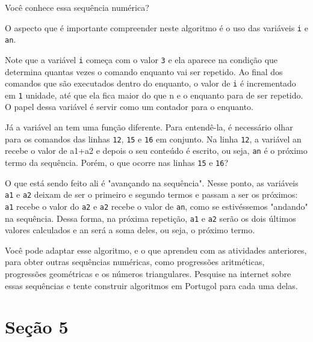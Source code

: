 \begin{reflection}
Você conhece essa sequência numérica?
\end{reflection}

O aspecto que é importante compreender neste algoritmo é o uso das variáveis \verb|i| e \verb|an|.

Note que a variável \verb|i| começa com o valor \verb|3| e ela aparece na condição que determina quantas vezes o comando enquanto vai ser repetido. Ao final dos comandos que são executados dentro do enquanto, o valor de \verb|i| é incrementado em \verb|1| unidade, até que ela fica maior do que n e o enquanto para de ser repetido. O papel dessa variável é servir como um contador para o enquanto.

Já a variável an tem uma função diferente. Para entendê-la, é necessário olhar para os comandos das linhas \verb|12|, \verb|15| e \verb|16| em conjunto. Na linha \verb|12|, a variável an recebe o valor de a1+a2 e depois o seu conteúdo é escrito, ou seja, \verb|an| é o próximo termo da sequência. Porém, o que ocorre nas linhas \verb|15| e \verb|16|?

O que está sendo feito ali é "avançando na sequência". Nesse ponto, as variáveis \verb|a1| e \verb|a2| deixam de ser o primeiro e segundo termos e passam a ser os próximos: \verb|a1| recebe o valor do \verb|a2| e \verb|a2| recebe o valor de \verb|an|, como se estivéssemos "andando"{} na sequência. Dessa forma, na próxima repetição, \verb|a1| e \verb|a2| serão os dois últimos valores calculados e an será a soma deles, ou seja, o próximo termo.

Você pode adaptar esse algoritmo, e o que aprendeu com as atividades anteriores, para obter outras sequências numéricas, como progressões aritméticas, progressões geométricas e os números triangulares. Pesquise na internet sobre essas sequências e tente construir algoritmos em Portugol para cada uma delas.

\section{Seção 5}

